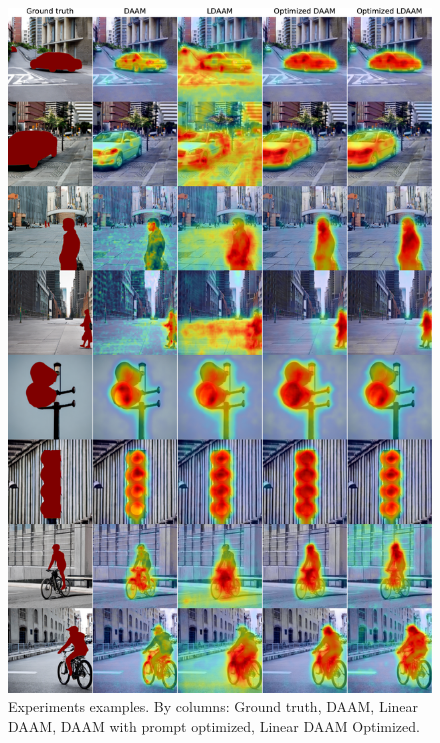 \begin{figure}
    \centering
    \includegraphics[width=0.93\columnwidth]{img/4-experiments/final_examples_2.pdf}
   \caption[Experiments examples]{Experiments examples. By columns: Ground truth, DAAM, Linear DAAM, DAAM with prompt optimized, Linear DAAM Optimized.}
    \label{fig:final-examples}
\end{figure}
